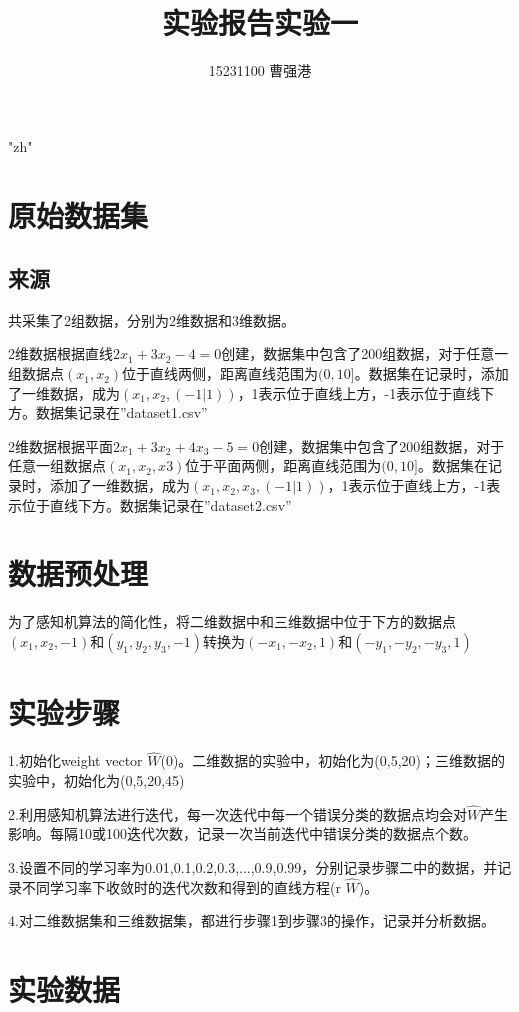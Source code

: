 \documentclass[10pt,a4paper]{ctexart}
\title {实验报告实验一}
\author {15231100 曹强港}
\date{}
\begin{document}
\setlength{\parindent}{2em}
\XeTeXlinebreaklocale "zh"  
\maketitle
\section{原始数据集}
\subsection{来源}
{共采集了2组数据，分别为2维数据和3维数据。}

{2维数据根据直线$2x_1+3x_2 - 4 = 0$创建，数据集中包含了200组数据，对于任意一组数据点$(x_1,x_2)$位于直线两侧，距离直线范围为$(0,10]$。数据集在记录时，添加了一维数据，成为$(x_1,x_2,(-1 | 1))$，1表示位于直线上方，-1表示位于直线下方。数据集记录在''dataset1.csv''}

{2维数据根据平面$2x_1+3x_2+ 4x_3 - 5 = 0$创建，数据集中包含了200组数据，对于任意一组数据点$(x_1,x_2,x3)$位于平面两侧，距离直线范围为$(0,10]$。数据集在记录时，添加了一维数据，成为$(x_1,x_2,x_3,(-1 | 1))$，1表示位于直线上方，-1表示位于直线下方。数据集记录在''dataset2.csv''}

\section{数据预处理}
{为了感知机算法的简化性，将二维数据中和三维数据中位于下方的数据点$(x_1,x_2,-1)$和$(y_1,y_2,y_3,-1)$转换为$(-x_1,-x_2,1)$和$(-y_1,-y_2,-y_3,1)$}
\section{实验步骤}
{1.初始化weight vector $\hat{W}$(0)。二维数据的实验中，初始化为(0,5,20)；三维数据的实验中，初始化为(0,5,20,45) }

{2.利用感知机算法进行迭代，每一次迭代中每一个错误分类的数据点均会对$\hat{W}$产生影响。每隔10或100迭代次数，记录一次当前迭代中错误分类的数据点个数。}

{3.设置不同的学习率为0.01,0.1,0.2,0.3,...,0.9,0.99，分别记录步骤二中的数据，并记录不同学习率下收敛时的迭代次数和得到的直线方程(r $\hat{W}$)。}

{4.对二维数据集和三维数据集，都进行步骤1到步骤3的操作，记录并分析数据。}

\section{实验数据}
\end{document}
